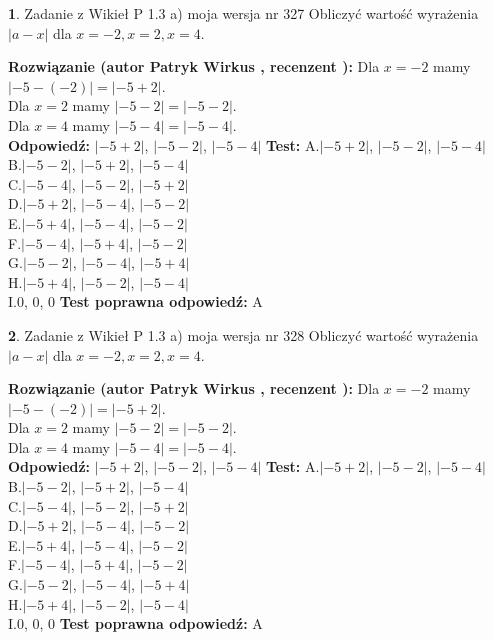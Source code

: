 \documentclass[12pt, a4paper]{article}
\theoremstyle{definition} %
\newtheorem{zad}{}
\newcommand{\zadStart}[1]{\begin{zad}#1\newline}
\newcommand{\zadStop}{\end{zad}}
\newcommand{\rozwStart}[2]{\noindent \textbf{Rozwiązanie (autor #1 , recenzent #2): }\newline}
\newcommand{\rozwStop}{\newline}
\newcommand{\odpStart}{\noindent \textbf{Odpowiedź:}\newline}
\newcommand{\odpStop}{\newline}
\newcommand{\testStart}{\noindent \textbf{Test:}\newline}
\newcommand{\testStop}{\newline}
\newcommand{\kluczStart}{\noindent \textbf{Test poprawna odpowiedź:}\newline}
\newcommand{\kluczStop}{\newline}
\begin{document}
\zadStart{Zadanie z Wikieł P 1.3 a) moja wersja nr 327}
Obliczyć wartość wyrażenia $|a - x|$ dla $x=-2,x=2,x=4$.
\zadStop
\rozwStart{Patryk Wirkus}{}
Dla $x = -2$ mamy $|-5 - (-2)| = |-5 + 2|$.\\
Dla $x = 2$ mamy $|-5 - 2| = |-5 - 2|$.\\
Dla $x = 4$ mamy $|-5 - 4| = |-5 - 4|$.\\
\rozwStop
\odpStart
$|-5 + 2|$, $|-5 - 2|$, $|-5 - 4|$
\odpStop
\testStart
A.$|-5 + 2|$, $|-5 - 2|$, $|-5 - 4|$\\
B.$|-5 - 2|$, $|-5 + 2|$, $|-5 - 4|$\\
C.$|-5 - 4|$, $|-5 - 2|$, $|-5 + 2|$\\
D.$|-5 + 2|$, $|-5 - 4|$, $|-5 - 2|$\\
E.$|-5 + 4|$, $|-5 - 4|$, $|-5 - 2|$\\
F.$|-5 - 4|$, $|-5 + 4|$, $|-5 - 2|$\\
G.$|-5 - 2|$, $|-5 - 4|$, $|-5 + 4|$\\
H.$|-5 + 4|$, $|-5 - 2|$, $|-5 - 4|$\\
I.$0$, $0$, $0$
\testStop
\kluczStart
A
\kluczStop



\zadStart{Zadanie z Wikieł P 1.3 a) moja wersja nr 328}
Obliczyć wartość wyrażenia $|a - x|$ dla $x=-2,x=2,x=4$.
\zadStop
\rozwStart{Patryk Wirkus}{}
Dla $x = -2$ mamy $|-5 - (-2)| = |-5 + 2|$.\\
Dla $x = 2$ mamy $|-5 - 2| = |-5 - 2|$.\\
Dla $x = 4$ mamy $|-5 - 4| = |-5 - 4|$.\\
\rozwStop
\odpStart
$|-5 + 2|$, $|-5 - 2|$, $|-5 - 4|$
\odpStop
\testStart
A.$|-5 + 2|$, $|-5 - 2|$, $|-5 - 4|$\\
B.$|-5 - 2|$, $|-5 + 2|$, $|-5 - 4|$\\
C.$|-5 - 4|$, $|-5 - 2|$, $|-5 + 2|$\\
D.$|-5 + 2|$, $|-5 - 4|$, $|-5 - 2|$\\
E.$|-5 + 4|$, $|-5 - 4|$, $|-5 - 2|$\\
F.$|-5 - 4|$, $|-5 + 4|$, $|-5 - 2|$\\
G.$|-5 - 2|$, $|-5 - 4|$, $|-5 + 4|$\\
H.$|-5 + 4|$, $|-5 - 2|$, $|-5 - 4|$\\
I.$0$, $0$, $0$
\testStop
\kluczStart
A
\kluczStop
\end{document}
